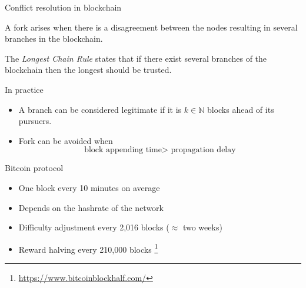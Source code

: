 \documentclass{beamer}
\newcommand\blfootnote[1]{%
  \begingroup
  \renewcommand\thefootnote{}\footnote{#1}%
  \addtocounter{footnote}{-1}%
  \endgroup
}
\begin{document}
\begin{frame}{Conflict resolution in blockchain}
\begin{tcolorbox}[enhanced,drop shadow, title=Fork]
    A fork arises when there is a disagreement between the nodes resulting in several branches in the blockchain.
\end{tcolorbox}
\begin{tcolorbox}[enhanced,drop shadow, title=LCR]
    The \textit{Longest Chain Rule} states that if there exist several branches of the blockchain then the longest should be trusted.
\end{tcolorbox}
In practice 
\begin{itemize}
  \item A branch can be considered legitimate if it is $k\in\mathbb{N}$ blocks ahead of its pursuers.
  \item Fork can be avoided when
  $$
  \text{block appending time}> \text{ propagation delay} 
  $$
\end{itemize}
\end{frame}
\begin{frame}{Bitcoin protocol}
\begin{itemize}
  \item One block every 10 minutes on average
  \item Depends on the hashrate of the network
  \item Difficulty adjustment every 2,016 blocks ($\approx$ two weeks)
  \item Reward halving every 210,000 blocks\blfootnote{\url{https://www.bitcoinblockhalf.com/}}
\end{itemize}

\end{frame}
\end{document}

